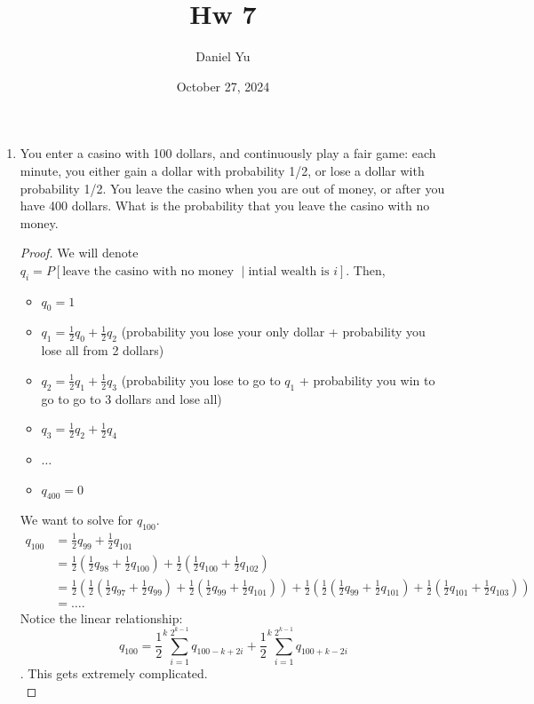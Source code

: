 \documentclass[a4paper]{article}
\title{\Huge{Hw 7}}
\author{\huge{Daniel Yu}}
\date{October 27, 2024}
\begin{document}
\maketitle
\newpage%
\pagebreak

\begin{enumerate}
  \item You enter a casino with 100 dollars, and continuously play a fair game: each minute, you either
gain a dollar with probability 1/2, or lose a dollar with probability 1/2. You leave the casino when
you are out of money, or after you have 400 dollars. What is the probability that you leave the
casino with no money.

\begin{proof}
  We will denote $q_i = P[\text{leave the casino with no money } \mid \text{intial wealth is $i$}]$. Then,
  \begin{itemize}
    \item $q_0 = 1$
    \item $q_1 = \frac{1}{2} q_0 + \frac{1}{2} q_2$ (probability you lose your only dollar + probability you lose all from 2 dollars)
    \item $q_2 = \frac{1}{2} q_1 + \frac{1}{2} q_3$ (probability you lose to go to $q_1$ + probability you win to go to go to 3 dollars and lose all)
    \item $q_3 = \frac{1}{2} q_2 + \frac{1}{2} q_4$ 
    \item $\ldots$
    \item $q_{400}= 0$
  \end{itemize}
  We want to solve for $q_{100}$.  
  \begin{align*}
    q_{100} &= \frac{1}{2} q_{99} + \frac{1}{2} q_{101} \\
            &= \frac{1}{2} \left( \frac{1}{2}q_{98} + \frac{1}{2} q_{100} \right)  + \frac{1}{2} \left( \frac{1}{2} q_{100} + \frac{1}{2} q_{102} \right) \\
            &= \frac{1}{2} \left(\frac{1}{2} (\frac{1}{2} q_{97} + \frac{1}{2} q_{99}) + \frac{1}{2} (\frac{1}{2}q_{99} + \frac{1}{2} q_{101})\right) + \frac{1}{2} \left( \frac{1}{2} (\frac{1}{2}q_{99} + \frac{1}{2} q_{101}) + \frac{1}{2} ( \frac{1}{2} q_{101}  + \frac{1}{2} q_{103} ) \right)  \\
            &= \ldots
  .\end{align*}
  Notice the linear relationship: 
  $$q_{100} = \frac{1}{2}^{k} \sum_{i=1}^{2^{k - 1}} q_{100 -k + 2i} + \frac{1}{2}^{k} \sum_{i=1}^{2^{k-1}} q_{100 + k - 2i}$$. This gets extremely complicated. \\


\end{proof}
\end{enumerate}
\end{document}
